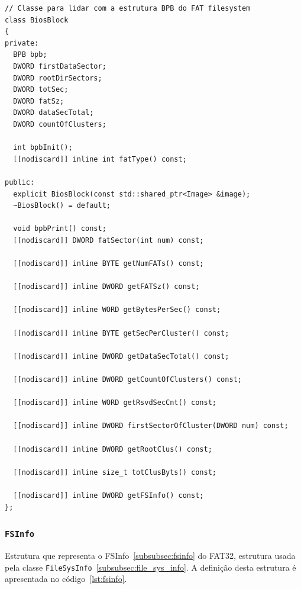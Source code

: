 \documentclass[
    12pt,				%
    oneside,   	        %
    a4paper,			%
    english,			%
    french,				%
    spanish,			%
    brazil,				%
    ]{pacotes/abntex2}
\begin{document}
\begin{lstlisting}[caption={Classe que abstrai a extração de informações da estrutura BPB}, label={lst:biosblock}]
// Classe para lidar com a estrutura BPB do FAT filesystem
class BiosBlock
{
private:
  BPB bpb;
  DWORD firstDataSector;
  DWORD rootDirSectors;
  DWORD totSec;
  DWORD fatSz;
  DWORD dataSecTotal;
  DWORD countOfClusters;

  int bpbInit();
  [[nodiscard]] inline int fatType() const;

public:
  explicit BiosBlock(const std::shared_ptr<Image> &image);
  ~BiosBlock() = default;

  void bpbPrint() const;
  [[nodiscard]] DWORD fatSector(int num) const;
  
  [[nodiscard]] inline BYTE getNumFATs() const;
  
  [[nodiscard]] inline DWORD getFATSz() const;
  
  [[nodiscard]] inline WORD getBytesPerSec() const;
  
  [[nodiscard]] inline BYTE getSecPerCluster() const;
  
  [[nodiscard]] inline DWORD getDataSecTotal() const;
  
  [[nodiscard]] inline DWORD getCountOfClusters() const;
  
  [[nodiscard]] inline WORD getRsvdSecCnt() const;
  
  [[nodiscard]] inline DWORD firstSectorOfCluster(DWORD num) const;
  
  [[nodiscard]] inline DWORD getRootClus() const;
  
  [[nodiscard]] inline size_t totClusByts() const;
  
  [[nodiscard]] inline DWORD getFSInfo() const;
};
\end{lstlisting}

\subsubsection{\texttt{FSInfo}}
\label{subsubsec:fsinfo_code}

Estrutura que representa o FSInfo~\ref{subsubsec:fsinfo} do FAT32, estrutura usada pela classe \texttt{FileSysInfo}~\ref{subsubsec:file_sys_info}. A definição desta estrutura é apresentada no código~\ref{lst:fsinfo}.
\end{document}
